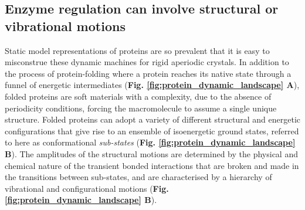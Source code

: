 \subsection{Enzyme regulation can involve structural or vibrational motions}
Static model representations of proteins are so prevalent that it is easy to misconstrue these dynamic machines for rigid aperiodic crystals. In addition to the process of protein-folding where a protein reaches its native state through a funnel of energetic intermediates (\textbf{Fig. \ref{fig:protein_dynamic_landscape} A}), folded proteins are soft materials with a complexity, due to the absence of periodicity conditions, forcing the macromolecule to assume a single unique structure. Folded proteins can adopt a variety of different structural and energetic configurations that give rise to an ensemble of isoenergetic ground states, referred to here as conformational \textit{sub-states} (\textbf{Fig. \ref{fig:protein_dynamic_landscape} B}). The amplitudes of the structural motions are determined by the physical and chemical nature of the transient bonded interactions that are broken and made in the transitions between sub-states, and are characterised by a hierarchy of vibrational and configurational motions (\textbf{Fig. \ref{fig:protein_dynamic_landscape} B}). 
%
%
%
